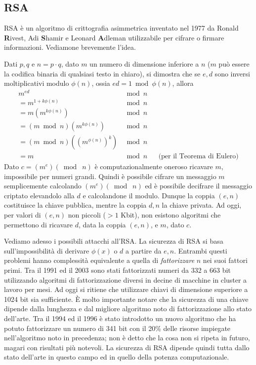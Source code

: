 \subsection{RSA}
RSA è un algoritmo di crittografia asimmetrica inventato nel 1977 da Ronald \textbf{R}ivest, Adi \textbf{S}hamir e Leonard \textbf{A}dleman utilizzabile per cifrare o firmare informazioni. Vediamone brevemente l'idea.

Dati $p, q$ e $n=p\cdot q$, dato $m$ un numero di dimensione inferiore a $n$ ($m$ può essere la codifica binaria di qualsiasi testo in chiaro), si dimostra che se $e, d$ sono inversi moltiplicativi modulo $\phi(n)$, ossia $ed=1\bmod\phi(n)$, allora
\begin{align*}
	m^{ed}&\bmod n && \\
	=m^{1+k\phi(n)}&\bmod n && \\
	=m(m^{k\phi(n)})&\bmod n && \\
	=(m\bmod n)(m^{k\phi(n)})&\bmod n && \\
	=(m\bmod n)((m^{\phi(n)})^k)&\bmod n && \\
	=m&\bmod n && \text{(per il Teorema di Eulero)}
\end{align*}
Dato $c=(m^e) (\bmod\;n)$ è computazionalmente oneroso ricavare $m$, impossibile per numeri grandi. Quindi è possibile cifrare un messaggio $m$ semplicemente calcolando $(m^e)(\bmod\; n)$ ed è possibile decifrare il messaggio criptato elevandolo alla $d$ e calcolandone il modulo. Dunque la coppia $(e, n)$ costituisce la chiave pubblica, mentre la coppia $d, n$ la chiave privata. Ad oggi, per valori di $(e, n)$ non piccoli ($> 1$ Kbit), non esistono algoritmi che permettono di ricavare $d$, data la coppia $(e, n)$, e $m$, dato $c$.

Vediamo adesso i possibili attacchi all'RSA. La sicurezza di RSA si basa sull'impossibilità di derivare $\phi(x)$ o $d$ a partire da $e, n$. Entrambi questi problemi hanno complessità equivalente a quella di \textit{fattorizzare} $n$ nei suoi fattori primi. Tra il 1991 ed il 2003 sono stati fattorizzati numeri da 332 a 663 bit utilizzando algoritmi di fattorizzazione diversi in decine di macchine in cluster a lavoro per mesi. Ad oggi si ritiene che utilizzare chiavi di dimensione superiore a 1024 bit sia sufficiente. È molto importante notare che la sicurezza di una chiave dipende dalla lunghezza e dal migliore algoritmo noto di fattorizzazione allo stato dell'arte. Tra il 1994 ed il 1996 è stato introdotto un nuovo algoritmo che ha potuto fattorizzare un numero di 341 bit con il 20\% delle risorse impiegate nell'algoritmo noto in precedenza; non è detto che la cosa non si ripeta in futuro, magari con risultati più notevoli. La sicurezza di RSA dipende quindi tutta dallo stato dell'arte in questo campo ed in quello della potenza computazionale.

